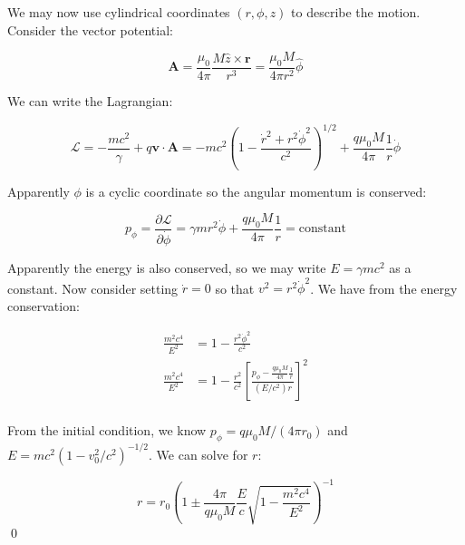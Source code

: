 \documentclass[12pt]{article}
\begin{document}
We may now use cylindrical coordinates $(r, \phi, z)$ to describe the motion. Consider the vector potential:

\begin{equation}
    \mathbf{A} = \frac{\mu_{0}}{4\pi} \frac{M \hat{z} \times \mathbf{r}}{r^{3}} = \frac{\mu_{0} M}{4\pi r^{2}} \hat{\phi}
\end{equation}

We can write the Lagrangian:

\begin{equation}
    \mathcal{L} = -\frac{mc^{2}}{\gamma} + q \mathbf{v} \cdot \mathbf{A} = -mc^{2} \left( 1 - \frac{\dot{r}^{2} + r^{2} \dot{\phi}^{2}}{c^{2}} \right)^{1/2} + \frac{q\mu_{0} M}{4\pi} \frac{1}{r} \dot{\phi}
\end{equation}

Apparently $\phi$ is a cyclic coordinate so the angular momentum is conserved:

\begin{equation}
    p_{\phi} = \frac{\partial \mathcal{L}}{\partial \dot{\phi}} = \gamma m r^{2} \dot{\phi} + \frac{q\mu_{0} M}{4\pi} \frac{1}{r} = \text{constant}
\end{equation}

Apparently the energy is also conserved, so we may write $E = \gamma m c^{2}$ as a constant. Now consider setting $\dot{r} = 0$ so that $v^{2} = r^{2} \dot{\phi}^{2}$. We have from the energy conservation:

\begin{equation}
    \begin{split}
        \frac{m^{2}c^{4}}{E^{2}} &= 1 - \frac{r^{2} \dot{\phi}^{2}}{c^{2}} \\
        \frac{m^{2}c^{4}}{E^{2}} &= 1 - \frac{r^{2}}{c^{2}} \left[ \frac{p_{\phi} - \frac{q\mu_{0} M}{4\pi} \frac{1}{r}}{(E/c^{2}) r} \right]^{2} \\
    \end{split}
\end{equation}

From the initial condition, we know $p_{\phi} = q\mu_{0} M/(4\pi r_{0})$ and $E = mc^{2}(1 - v_{0}^{2}/c^{2})^{-1/2}$. We can solve for $r$:

\begin{equation}
    r = r_{0} \left( 1 \pm \frac{4\pi}{q\mu_{0} M} \frac{E}{c} \sqrt{1 - \frac{m^{2}c^{4}}{E^{2}}} \right)^{-1}
\end{equation}
\qed


\end{document}
